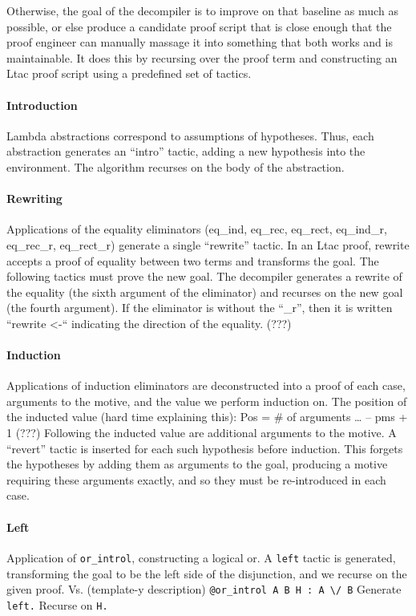 Otherwise, the goal of the decompiler is to improve on that baseline as much as possible,
or else produce a candidate proof script that is close enough that the proof engineer can manually massage it into something that
both works and is maintainable.
It does this by recursing over the proof term and constructing an Ltac proof script using a predefined set of tactics.

\paragraph{Introduction}
Lambda abstractions correspond to assumptions of hypotheses. Thus, each abstraction generates an “intro” tactic, adding a new hypothesis into the environment. The algorithm recurses on the body of the abstraction.

\paragraph{Rewriting}
Applications of the equality eliminators (eq_ind, eq_rec, eq_rect, eq_ind_r, eq_rec_r, eq_rect_r) generate a single “rewrite” tactic. In an Ltac proof, rewrite accepts a proof of equality between two terms and transforms the goal. The following tactics must prove the new goal. The decompiler generates a rewrite of the equality (the sixth argument of the eliminator) and recurses on the new goal (the fourth argument). If the eliminator is without the “_r”, then it is written “rewrite <-“ indicating the direction of the equality. (???)

\paragraph{Induction}
Applications of induction eliminators are deconstructed into a proof of each case, arguments to the motive, and the value we perform induction on.
The position of the inducted value (hard time explaining this): Pos = \# of arguments … – pms + 1 (???)
Following the inducted value are additional arguments to the motive. A “revert” tactic is inserted for each such hypothesis before induction. This forgets the hypotheses by adding them as arguments to the goal, producing a motive requiring these arguments exactly, and so they must be re-introduced in each case.

\paragraph{Left}
Application of \lstinline{or_introl}, constructing a logical or. A \lstinline{left} tactic is generated, transforming the goal to be the left side of the disjunction, and we recurse on the given proof.
Vs. (template-y description)
\lstinline{@or_introl A B H : A \/ B}
Generate \lstinline{left.}
Recurse on \lstinline{H.}

